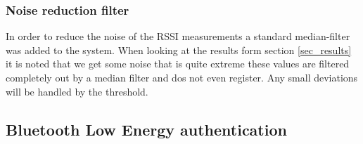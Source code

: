 

\subsubsection{Noise reduction filter}
In order to reduce the noise of the RSSI measurements a standard median-filter was added to the system. When looking at the results form section \ref{sec_results} it is noted that we get some noise that is quite extreme these values are filtered completely out by a median filter and dos not even register. Any small deviations will be handled by the threshold.

\subsection{Bluetooth Low Energy authentication}
